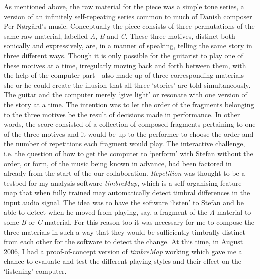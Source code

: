 \label{sec:3-par:2}
As mentioned above, the raw material for the piece was a simple tone series, a version of an infinitely self-repeating series common to much of Danish composer Per N{\o}rg{\aa}rd's music. Conceptually the piece consists of three permutations of the same raw material, labelled \emph{A}, \emph{B} and \emph{C}. These three motives, distinct both sonically and expressively, are, in a manner of speaking, telling the same story in three different ways. Though it is only possible for the guitarist to play one of these motives at a time, irregularly moving back and forth between them, with the help of the computer part---also made up of three corresponding materials---she or he could create the illusion that all three `stories' are told simultaneously. The guitar and the computer merely `give light' or resonate with one version of the story at a time. The intention was to let the order of the fragments belonging to the three motives be the result of decisions made in performance. In other words, the score consisted of a collection of composed fragments pertaining to one of the three motives and it would be up to the performer to choose the order and the number of repetitions each fragment would play. The interactive challenge, i.e. the question of how to get the computer to `perform' with Stefan without the order, or form, of the music being known in advance, had been factored in already from the start of the our collaboration. \emph{Repetition} was thought to be a testbed for my analysis software \emph{timbreMap}, which is a self organising feature map that when fully trained may automatically detect timbral differences in the input audio signal. The idea was to have the software `listen' to Stefan and be able to detect when he moved from playing, say, a fragment of the \emph{A} material to some \emph{B} or \emph{C} material. For this reason too it was necessary for me to compose the three materials in such a way that they would be sufficiently timbrally distinct from each other for the software to detect the change. At this time, in August 2006, I had a proof-of-concept version of \emph{timbreMap} working which gave me a chance to evaluate and test the different playing styles and their effect on the `listening' computer.

